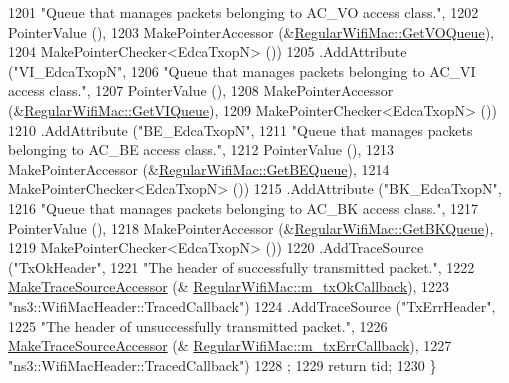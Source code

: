 \begin{DoxyCode}
1201                    \textcolor{stringliteral}{"Queue that manages packets belonging to AC\_VO access class."},
1202                    PointerValue (),
1203                    MakePointerAccessor (&\hyperlink{classns3_1_1RegularWifiMac_af762e3e828819033fd37d533174047e3}{RegularWifiMac::GetVOQueue}),
1204                    MakePointerChecker<EdcaTxopN> ())
1205     .AddAttribute (\textcolor{stringliteral}{"VI\_EdcaTxopN"},
1206                    \textcolor{stringliteral}{"Queue that manages packets belonging to AC\_VI access class."},
1207                    PointerValue (),
1208                    MakePointerAccessor (&\hyperlink{classns3_1_1RegularWifiMac_afc644c868a54ac3f20c3312efa9db472}{RegularWifiMac::GetVIQueue}),
1209                    MakePointerChecker<EdcaTxopN> ())
1210     .AddAttribute (\textcolor{stringliteral}{"BE\_EdcaTxopN"},
1211                    \textcolor{stringliteral}{"Queue that manages packets belonging to AC\_BE access class."},
1212                    PointerValue (),
1213                    MakePointerAccessor (&\hyperlink{classns3_1_1RegularWifiMac_a4d74298f820e686659ef42bc07a68f7e}{RegularWifiMac::GetBEQueue}),
1214                    MakePointerChecker<EdcaTxopN> ())
1215     .AddAttribute (\textcolor{stringliteral}{"BK\_EdcaTxopN"},
1216                    \textcolor{stringliteral}{"Queue that manages packets belonging to AC\_BK access class."},
1217                    PointerValue (),
1218                    MakePointerAccessor (&\hyperlink{classns3_1_1RegularWifiMac_acbaa021944886a32380803d17564cb15}{RegularWifiMac::GetBKQueue}),
1219                    MakePointerChecker<EdcaTxopN> ())
1220     .AddTraceSource (\textcolor{stringliteral}{"TxOkHeader"},
1221                      \textcolor{stringliteral}{"The header of successfully transmitted packet."},
1222                      \hyperlink{group__tracing_gab21a770b9855af4e8f69f7531ea4a6b0}{MakeTraceSourceAccessor} (&
      \hyperlink{classns3_1_1RegularWifiMac_aa6135b5824d4ee16632c1f4783d49c28}{RegularWifiMac::m\_txOkCallback}),
1223                      \textcolor{stringliteral}{"ns3::WifiMacHeader::TracedCallback"})
1224     .AddTraceSource (\textcolor{stringliteral}{"TxErrHeader"},
1225                      \textcolor{stringliteral}{"The header of unsuccessfully transmitted packet."},
1226                      \hyperlink{group__tracing_gab21a770b9855af4e8f69f7531ea4a6b0}{MakeTraceSourceAccessor} (&
      \hyperlink{classns3_1_1RegularWifiMac_ab206880e22c96a9e63e71d79957f75d0}{RegularWifiMac::m\_txErrCallback}),
1227                      \textcolor{stringliteral}{"ns3::WifiMacHeader::TracedCallback"})
1228   ;
1229   \textcolor{keywordflow}{return} tid;
1230 \}
\end{DoxyCode}


